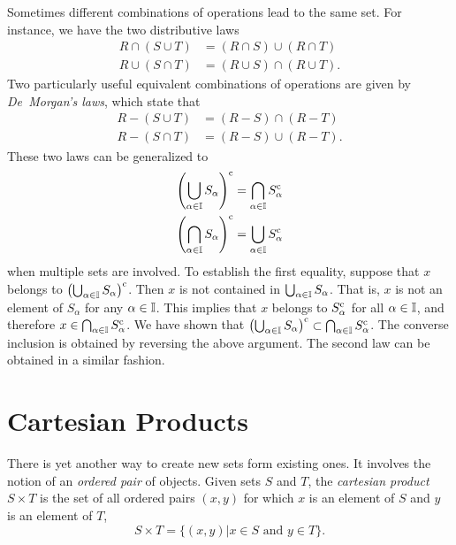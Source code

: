 Sometimes different combinations of operations lead to the same set.
For instance, we have the two distributive laws
\begin{align*}
R \cap (S \cup T) &= (R \cap S) \cup (R \cap T) \\
R \cup (S \cap T) &= (R \cup S) \cap (R \cup T).
\end{align*}
Two particularly useful equivalent combinations of operations are given by \emph{De~Morgan's laws}, which state that 
\begin{align*}
R - (S \cup T) &= (R - S) \cap (R - T) \\
R - (S \cap T) &= (R - S) \cup (R - T).
\end{align*}
These two laws can be generalized to
\begin{align*}
\left( \bigcup_{\alpha \in \mathbb{I}} S_{\alpha} \right)^{\mathrm{c}}
&= \bigcap_{\alpha \in \mathbb{I}} S_{\alpha}^{\mathrm{c}} \\
\left( \bigcap_{\alpha \in \mathbb{I}} S_{\alpha} \right)^{\mathrm{c}}
&= \bigcup_{\alpha \in \mathbb{I}} S_{\alpha}^{\mathrm{c}}
\end{align*}
when multiple sets are involved.
To establish the first equality, suppose that $x$ belongs to $\left( \bigcup_{\alpha \in \mathbb{I}} S_{\alpha} \right)^{\mathrm{c}}$.
Then $x$ is not contained in $\bigcup_{\alpha \in \mathbb{I}} S_{\alpha}$.
That is, $x$ is not an element of $S_{\alpha}$ for any $\alpha \in \mathbb{I}$.
This implies that $x$ belongs to $S_{\alpha}^{\mathrm{c}}$ for all $\alpha \in \mathbb{I}$, and therefore $x \in \bigcap_{\alpha \in \mathbb{I}} S_{\alpha}^{\mathrm{c}}$.
We have shown that $\left( \bigcup_{\alpha \in \mathbb{I}} S_{\alpha} \right)^{\mathrm{c}} \subset \bigcap_{\alpha \in \mathbb{I}} S_{\alpha}^{\mathrm{c}}$.
The converse inclusion is obtained by reversing the above argument.
The second law can be obtained in a similar fashion.


\section{Cartesian Products}

There is yet another way to create new sets form existing ones.
It involves the notion of an \emph{ordered pair} of objects. 
Given sets $S$ and $T$, the \emph{cartesian product} $S \times T$ is the set of all ordered pairs $(x, y)$ for which $x$ is an element of $S$ and $y$ is an element of $T$, 
\begin{equation*}
S \times T = \{ (x, y) | x \in S \text{ and } y \in T \} .
\end{equation*}

